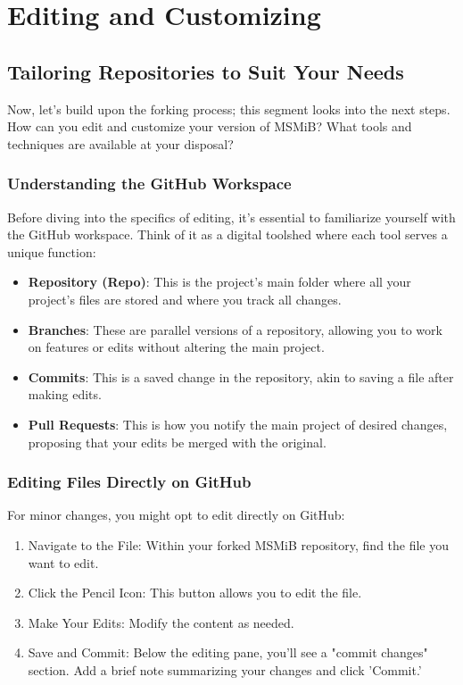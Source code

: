 \documentclass{book}
\begin{document}
\chapter{Editing and Customizing}
\section*{Tailoring Repositories to Suit Your Needs}
Now, let's build upon the forking process; this segment looks into the next steps. How can you edit and customize your version of MSMiB? What tools and techniques are available at your disposal? 

\subsection*{Understanding the GitHub Workspace}
Before diving into the specifics of editing, it's essential to familiarize yourself with the GitHub workspace. Think of it as a digital toolshed where each tool serves a unique function:

\begin{itemize}
    \item \textbf{Repository (Repo)}: This is the project's main folder where all your project's files are stored and where you track all changes.
    \item \textbf{Branches}: These are parallel versions of a repository, allowing you to work on features or edits without altering the main project.
    \item \textbf{Commits}: This is a saved change in the repository, akin to saving a file after making edits.
    \item \textbf{Pull Requests}: This is how you notify the main project of desired changes, proposing that your edits be merged with the original.
\end{itemize}

\subsection*{Editing Files Directly on GitHub}
For minor changes, you might opt to edit directly on GitHub:

\begin{enumerate}
    \item Navigate to the File: Within your forked MSMiB repository, find the file you want to edit.
    \item Click the Pencil Icon: This button allows you to edit the file.
    \item Make Your Edits: Modify the content as needed.
    \item Save and Commit: Below the editing pane, you'll see a "commit changes" section. Add a brief note summarizing your changes and click 'Commit.'
\end{enumerate}
\end{document}
